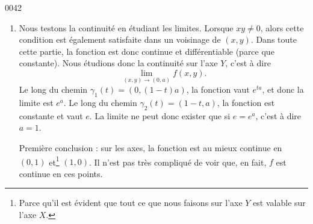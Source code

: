 \begin{corrige}{0042}
\begin{alternative}
\begin{enumerate}
\item\label{Item0042b}
Nous testons la continuité en étudiant les limites. Lorsque $xy\neq 0$, alors cette condition est également satisfaite dans un voisinage de $(x,y)$. Dans toute cette partie, la fonction est donc continue et différentiable (parce que constante). Nous étudions donc la continuité sur l'axe $Y$, c'est à dire
\begin{equation}
	\lim_{(x,y)\to(0,a)}f(x,y).
\end{equation}
Le long du chemin $\gamma_1(t)=(0,(1-t)a)$, la fonction vaut $ e^{ta}$, et donc la limite est $e^a$. Le long du chemin $\gamma_2(t)=(1-t,a)$, la fonction est constante et vaut $e$. La limite ne peut donc exister que si $e=e^a$, c'est à dire $a=1$.

Première conclusion : sur les axes, la fonction est au mieux continue en $(0,1)$ et\footnote{Parce qu'il est évident que tout ce que nous faisons sur l'axe $Y$ est valable sur l'axe $X$.} $(1,0)$. Il n'est pas très compliqué de voir que, en fait, $f$ est continue en ces points.


\end{enumerate}
\end{alternative}
\end{corrige}
